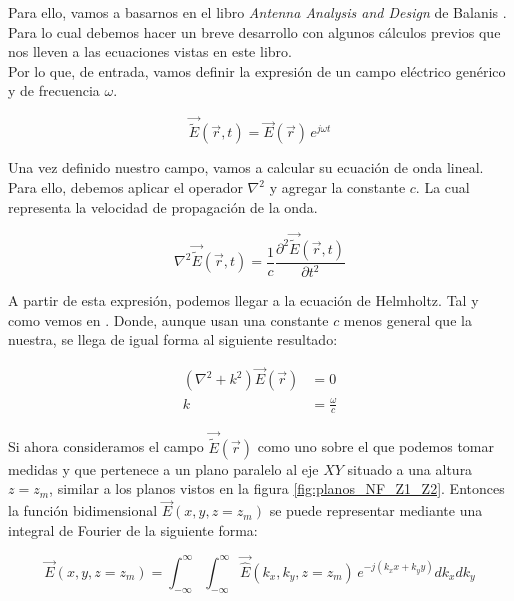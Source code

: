 \documentclass{article}
\begin{document}
Para ello, vamos a basarnos en el libro \textit{Antenna Analysis and Design} de Balanis \autocite{Balanis_2016}. Para lo cual debemos hacer un breve desarrollo con algunos cálculos previos que nos lleven a las ecuaciones vistas en este libro.
\\

Por lo que, de entrada, vamos definir la expresión de un campo eléctrico genérico y de frecuencia $\omega$.

\begin{equation}
\vec{\tilde{E}}(\vec{r},t)=\vec{E}(\vec{r})\,e^{j\omega t}
\label{NFtoNF: eq-Campo E generico}
\end{equation}

Una vez definido nuestro campo, vamos a calcular su ecuación de onda lineal. Para ello, debemos aplicar el operador $\nabla^{2}$ y agregar la constante $c$. La cual representa la velocidad de propagación de la onda.

\begin{equation}
\nabla^{2} \vec{\tilde{E}}(\vec{r},t)=\frac{1}{c}\frac{\partial^{2}
\vec{\tilde{E}}(\vec{r},t)}{\partial t^{2}}
\label{NFtoNF: eq-de-onde-campo-electrico}
\end{equation}

A partir de esta expresión, podemos llegar a la ecuación de Helmholtz. Tal y como vemos en \autocite{Pozar}. Donde, aunque usan una constante $c$ menos general que la nuestra, se llega de igual forma al siguiente resultado:
 
\begin{subequations}
\begin{align}
(\nabla^{2}+k^{2})\vec{E}(\vec{r})&=0\nonumber
\\
k&=\frac{\omega}{c}
\label{NFtoNF: eq-Helmholtz}
\end{align}
\end{subequations}

\newpage

Si ahora consideramos el campo $\vec{\tilde{E}}(\vec{r})$ como uno sobre el que podemos tomar medidas y que pertenece a un plano paralelo al eje $XY$ situado a una altura $z=z_{m}$, similar a los planos vistos en la figura \ref{fig:planos_NF_Z1_Z2}. Entonces la función bidimensional $\vec{E}(x,y,z=z_{m})$ se puede representar
mediante una integral de Fourier de la siguiente forma:

\begin{equation}
\vec{E}(x,y,z=z_{m})=\int_{-\infty}^{\infty}\int_{-\infty}^{\infty}\vec{\hat{E}}(k_{x},k_{y},z=z_{m})
\,e^{-j (k_{x} x+k_{y} y)} dk_{x} dk_{y}
\label{NFtoNF: eq-fourier-campo-electrico}
\end{equation}
\end{document}
